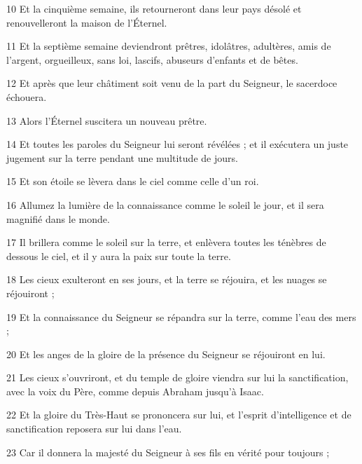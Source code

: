 \par 10 Et la cinquième semaine, ils retourneront dans leur pays désolé et renouvelleront la maison de l'Éternel.

\par 11 Et la septième semaine deviendront prêtres, idolâtres, adultères, amis de l'argent, orgueilleux, sans loi, lascifs, abuseurs d'enfants et de bêtes.

\par 12 Et après que leur châtiment soit venu de la part du Seigneur, le sacerdoce échouera.

\par 13 Alors l'Éternel suscitera un nouveau prêtre.

\par 14 Et toutes les paroles du Seigneur lui seront révélées ; et il exécutera un juste jugement sur la terre pendant une multitude de jours.

\par 15 Et son étoile se lèvera dans le ciel comme celle d'un roi.

\par 16 Allumez la lumière de la connaissance comme le soleil le jour, et il sera magnifié dans le monde.

\par 17 Il brillera comme le soleil sur la terre, et enlèvera toutes les ténèbres de dessous le ciel, et il y aura la paix sur toute la terre.

\par 18 Les cieux exulteront en ses jours, et la terre se réjouira, et les nuages ​​se réjouiront ;

\par 19 Et la connaissance du Seigneur se répandra sur la terre, comme l'eau des mers ;

\par 20 Et les anges de la gloire de la présence du Seigneur se réjouiront en lui.

\par 21 Les cieux s'ouvriront, et du temple de gloire viendra sur lui la sanctification, avec la voix du Père, comme depuis Abraham jusqu'à Isaac.

\par 22 Et la gloire du Très-Haut se prononcera sur lui, et l'esprit d'intelligence et de sanctification reposera sur lui dans l'eau.

\par 23 Car il donnera la majesté du Seigneur à ses fils en vérité pour toujours ;

